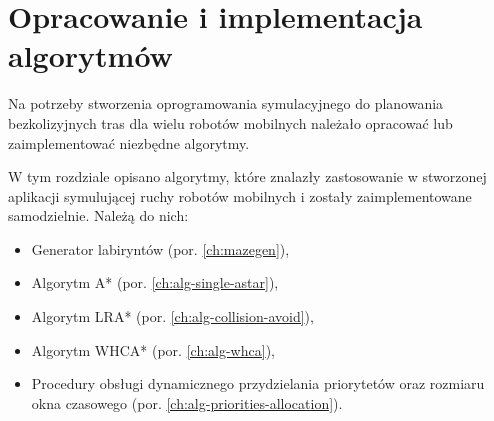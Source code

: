 \chapter{Opracowanie i implementacja algorytmów}
\label{ch:alg-impl}

Na potrzeby stworzenia oprogramowania symulacyjnego do planowania bezkolizyjnych tras dla wielu robotów mobilnych należało opracować lub zaimplementować niezbędne algorytmy.

W tym rozdziale opisano algorytmy, które znalazły zastosowanie w stworzonej aplikacji symulującej ruchy robotów mobilnych i zostały zaimplementowane samodzielnie. Należą do nich:
\begin{itemize}
	\item Generator labiryntów (por. \ref{ch:mazegen}),
	\item Algorytm A* (por. \ref{ch:alg-single-astar}),
	\item Algorytm LRA* (por. \ref{ch:alg-collision-avoid}),
	\item Algorytm WHCA* (por. \ref{ch:alg-whca}),
	\item Procedury obsługi dynamicznego przydzielania priorytetów oraz rozmiaru okna czasowego (por. \ref{ch:alg-priorities-allocation}).
\end{itemize}
